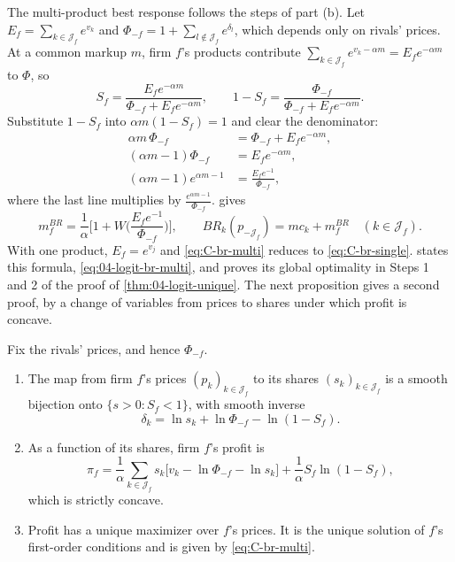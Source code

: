 The multi-product best response follows the steps of part (b). Let $E_f = \sum_{k \in \mathcal{J}_f}e^{v_k}$ and
$\Phi_{-f} = 1 + \sum_{l \notin \mathcal{J}_f}e^{\delta_l}$, which depends only on rivals' prices. At a common markup
$m$, firm $f$'s products contribute $\sum_{k \in \mathcal{J}_f}e^{v_k - \alpha m} = E_fe^{-\alpha m}$ to $\Phi$, so
\begin{equation*}
  S_f = \frac{E_fe^{-\alpha m}}{\Phi_{-f} + E_fe^{-\alpha m}} , \qquad
  1 - S_f = \frac{\Phi_{-f}}{\Phi_{-f} + E_fe^{-\alpha m}} .
\end{equation*}
Substitute $1 - S_f$ into $\alpha m(1 - S_f) = 1$ and clear the denominator:
\begin{align*}
  \alpha m\,\Phi_{-f} &= \Phi_{-f} + E_fe^{-\alpha m} , \\
  (\alpha m - 1)\Phi_{-f} &= E_fe^{-\alpha m} , \\
  (\alpha m - 1)e^{\alpha m - 1} &= \frac{E_fe^{-1}}{\Phi_{-f}} ,
\end{align*}
where the last line multiplies by $\frac{e^{\alpha m - 1}}{\Phi_{-f}}$.  gives
\begin{equation}\label{eq:C-br-multi}
  m_f^{BR} = \frac{1}{\alpha}\Big[1 + W\Big(\frac{E_fe^{-1}}{\Phi_{-f}}\Big)\Big] , \qquad
  BR_k(p_{-\mathcal{J}_f}) = mc_k + m_f^{BR} \quad (k \in \mathcal{J}_f) .
\end{equation}
With one product, $E_f = e^{v_j}$ and \eqref{eq:C-br-multi} reduces to \eqref{eq:C-br-single}. 
states this formula, \eqref{eq:04-logit-br-multi}, and proves its global optimality in Steps 1 and 2 of the proof
of \cref{thm:04-logit-unique}. The next proposition gives a second proof, by a change of variables from prices to
shares under which profit is concave.

\begin{proposition}\label{prop:C-firm-concave}
Fix the rivals' prices, and hence $\Phi_{-f}$.
\begin{enumerate}[label=(\roman*)]
  \item The map from firm $f$'s prices $(p_k)_{k \in \mathcal{J}_f}$ to its shares $(s_k)_{k \in \mathcal{J}_f}$ is a
  smooth bijection onto $\{s > 0 : S_f < 1\}$, with smooth inverse
  \begin{equation}\label{eq:C-share-inverse}
    \delta_k = \ln s_k + \ln\Phi_{-f} - \ln(1 - S_f) .
  \end{equation}
  \item As a function of its shares, firm $f$'s profit is
  \begin{equation}\label{eq:C-profit-shares}
    \pi_f = \frac{1}{\alpha}\sum_{k \in \mathcal{J}_f}s_k\big[v_k - \ln\Phi_{-f} - \ln s_k\big] + \frac{1}{\alpha}S_f\ln(1 - S_f) ,
  \end{equation}
  which is strictly concave.
  \item Profit has a unique maximizer over $f$'s prices. It is the unique solution of $f$'s first-order
  conditions and is given by \eqref{eq:C-br-multi}.
\end{enumerate}
\end{proposition}

